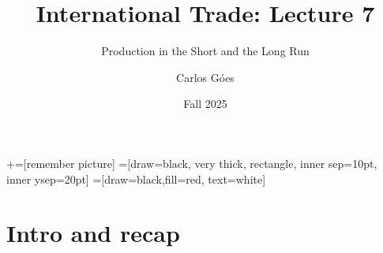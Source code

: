 \documentclass[notes,11pt, aspectratio=169, xcolor=table]{beamer}
\title[]{International Trade: Lecture 7}
\subtitle[]{Production in the Short and the Long Run}
\author[Góes]
{Carlos Góes\inst{1}}
\date{Fall 2025}
\institute[GWU]{\inst{1} George Washington University }
\begin{document}
\newcommand\marktopleft[1]{%
    \tikz[overlay,remember picture] 
        \node (marker-#1-a) at (-.3em,.3em) {};%
}
\newcommand\markbottomright[2]{%
    \tikz[overlay,remember picture] 
        \node (marker-#1-b) at (0em,0em) {};%
}
+=[remember picture] 
 =[draw=black, very thick, rectangle, inner sep=10pt, inner ysep=20pt]
 =[draw=black,fill=red, text=white]















\frame{\titlepage}
\addtocounter{framenumber}{-1}




\section{Intro and recap}
\end{document}

